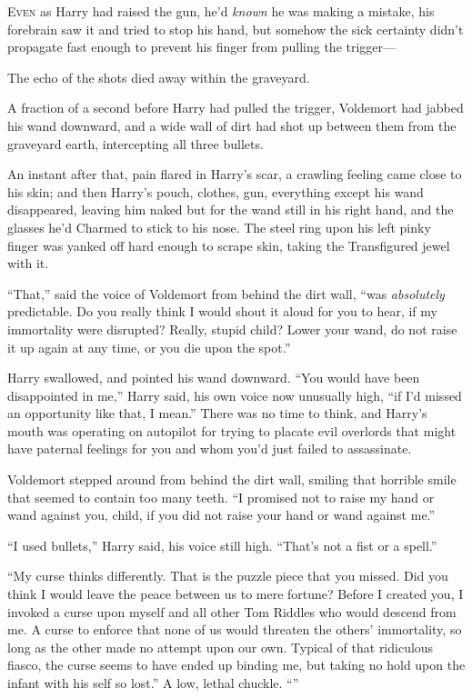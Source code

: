 
\lettrine{E}{ven} as Harry had
raised the gun, he’d \emph{known} he was making a mistake, his forebrain saw it and tried to stop his hand, but somehow the sick certainty didn’t propagate fast enough to prevent his finger from pulling the trigger—

The echo of the shots died away within the graveyard.

A fraction of a second before Harry had pulled the trigger, Voldemort had jabbed his wand downward, and a wide wall of dirt had shot up between them from the graveyard earth, intercepting all three bullets.

An instant after that, pain flared in Harry’s scar, a crawling feeling came close to his skin; and then Harry’s pouch, clothes, gun, everything except his wand disappeared, leaving him naked but for the wand still in his right hand, and the glasses he’d Charmed to stick to his nose. The steel ring upon his left pinky finger was yanked off hard enough to scrape skin, taking the Transfigured jewel with it.

“That,” said the voice of Voldemort from behind the dirt wall, “was \emph{absolutely} predictable. Do you really think I would shout it aloud for you to hear, if my immortality were disrupted? Really, stupid child? Lower your wand, do not raise it up again at any time, or you die upon the spot.”

Harry swallowed, and pointed his wand downward. “You would have been disappointed in me,” Harry said, his own voice now unusually high, “if I’d missed an opportunity like that, I mean.” There was no time to think, and Harry’s mouth was operating on autopilot for trying to placate evil overlords that might have paternal feelings for you and whom you’d just failed to assassinate.

Voldemort stepped around from behind the dirt wall, smiling that horrible smile that seemed to contain too many teeth. “I promised not to raise my hand or wand against you, child, if you did not raise your hand or wand against me.”

“I used bullets,” Harry said, his voice still high. “That’s not a fist or a spell.”

“My curse thinks differently. That is the puzzle piece that you missed. Did you think I would leave the peace between us to mere fortune? Before I created you, I invoked a curse upon myself and all other Tom Riddles who would descend from me. A curse to enforce that none of us would threaten the others’ immortality, so long as the other made no attempt upon our own. Typical of that ridiculous fiasco, the curse seems to have ended up binding me, but taking no hold upon the infant with his self so lost.” A low, lethal chuckle. “”

